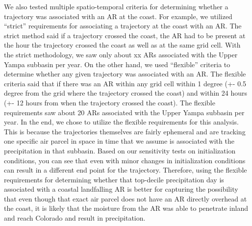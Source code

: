 \documentclass[draft]{agujournal2019}
\begin{document}
We also tested multiple spatio-temporal criteria for determining whether a trajectory was associated with an AR at the coast. For example, we utilized “strict” requirements for associating a trajectory at the coast with an AR. The strict method said if a trajectory crossed the coast, the AR had to be present at the hour the trajectory crossed the coast as well as at the same grid cell. With the strict methodology, we saw only about xx ARs associated with the Upper Yampa subbasin per year. On the other hand, we used “flexible” criteria to determine whether any given trajectory was associated with an AR. The flexible criteria said that if there was an AR within any grid cell within 1 degree (+- 0.5 degree from the grid where the trajectory crossed the coast) and within 24 hours (+- 12 hours from when the trajectory crossed the coast). The flexible requirements saw about 20 ARs associated with the Upper Yampa subbasin per year. In the end, we chose to utilize the flexible requirements for this analysis. This is because the trajectories themselves are fairly ephemeral and are tracking one specific air parcel in space in time that we assume is associated with the precipitation in that subbasin. Based on our sensitivity tests on initialization conditions, you can see that even with minor changes in initialization conditions can result in a different end point for the trajectory. Therefore, using the flexible requirements for determining whether that top-decile precipitation day is associated with a coastal landfalling AR is better for capturing the possibility that even though that exact air parcel does not have an AR directly overhead at the coast, it is likely that the moisture from the AR was able to penetrate inland and reach Colorado and result in precipitation.
\end{document}
